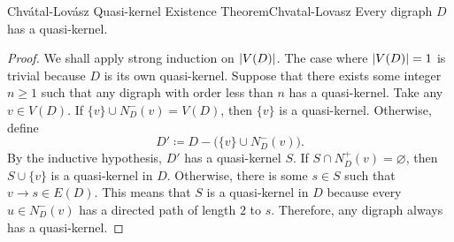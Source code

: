 \documentclass[math]{amznotes}
\theoremstyle{remark}
\newcommand{\0}{\mathbf{0}}
\newcommand{\1}{\mathbf{1}}
\begin{document}
\begin{thmbox}{Chv\'{a}tal-Lov\'{a}sz Quasi-kernel Existence Theorem}{Chvatal-Lovasz}
    Every digraph $D$ has a quasi-kernel.
    \tcblower
    \begin{proof}
        We shall apply strong induction on ${\left\lvert {V(D)} \right\rvert}$. The case where ${\left\lvert {V(D)} \right\rvert} = 1$ is trivial because $D$ is its own quasi-kernel. Suppose that there exists some integer $n \geq 1$ such that any digraph with order less than $n$ has a quasi-kernel. Take any $v \in V(D)$. If $\{v\} \cup N_D^-(v) = V(D)$, then $\{v\}$ is a quasi-kernel. Otherwise, define 
        \begin{equation*}
            D' \coloneqq D - \bigl(\{v\} \cup N_D^-(v)\bigr).
        \end{equation*}
        By the inductive hypothesis, $D'$ has a quasi-kernel $S$. If $S \cap N_D^+(v) = \varnothing$, then $S \cup \{v\}$ is a quasi-kernel in $D$. Otherwise, there is some $s \in S$ such that $v \to s \in E(D)$. This means that $S$ is a quasi-kernel in $D$ because every $u \in N_D^-(v)$ has a directed path of length $2$ to $s$. Therefore, any digraph always has a quasi-kernel.
    \end{proof}
\end{thmbox}
\end{document}
